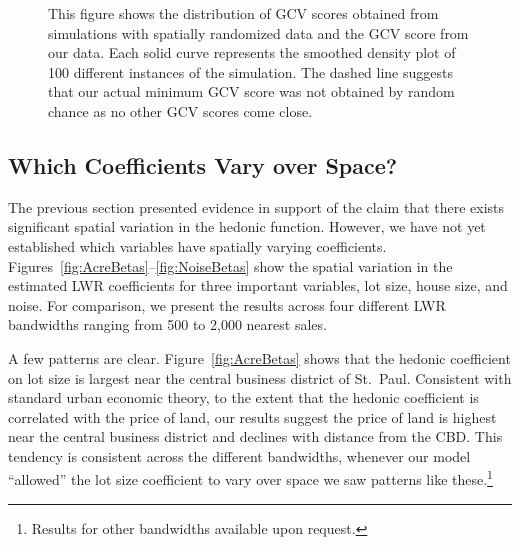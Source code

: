\documentclass[leqno]{article}\usepackage[]{graphicx}\usepackage[]{color}
\begin{document}
\begin{figure}
 \caption{This figure shows the distribution of GCV scores obtained from simulations with spatially randomized data and the GCV score from our data. Each solid curve represents the smoothed density plot of 100 different instances of the simulation. The dashed line suggests that our actual minimum GCV score was not obtained by random chance as no other GCV scores come close.}
 \label{fig:GCVSIM}
\end{figure}

\subsection*{Which Coefficients Vary over Space?}

The previous section presented evidence in support of the claim that there exists significant spatial variation in the hedonic function. However, we have not yet established which variables have spatially varying coefficients. Figures~\ref{fig:AcreBetas}--\ref{fig:NoiseBetas} show the spatial variation in the estimated LWR coefficients for three important variables, lot size, house size, and noise. For comparison, we present the results across four different LWR bandwidths ranging from 500 to 2,000 nearest sales. 

A few patterns are clear. Figure~\ref{fig:AcreBetas} shows that the hedonic coefficient on lot size is largest near the central business district of St.\ Paul. Consistent with standard urban economic theory, to the extent that the hedonic coefficient is correlated with the price of land, our results suggest the price of land is highest near the central business district and declines with distance from the CBD. This tendency is consistent across the different bandwidths, whenever our model ``allowed'' the lot size coefficient to vary over space we saw patterns like these.\footnote{Results for other bandwidths available upon request.} 
\end{document}
